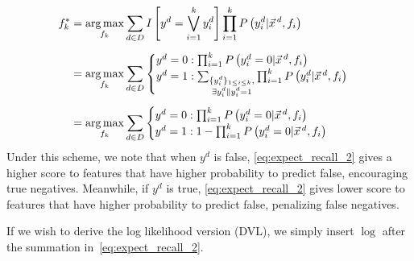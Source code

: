\begin{align}
f_k^*&=\argmax_{f_k}\sum_{d\in D}I\left[y^d=\bigvee_{i=1}^k y^d_i\right]\prod_{i=1}^kP\left(y_i^d|\vec{x}^{\,d},f_i\right)\nonumber\\[0.5em]
&=\argmax_{f_k}\sum_{d\in D}
\begin{cases}
	y^d=0: \prod_{i=1}^kP\left(y_i^d=0|\vec{x}^{\,d},f_i\right)\\
	y^d=1: \sum_{\substack{\{y_i^d\}_{1\leq i\leq k},\\ \exists{y_i^d\|y_i^d=1}}}\prod_{i=1}^kP\left(y_i^d|\vec{x}^{\,d},f_i\right)
\end{cases}\nonumber\\[0.5em]
&=\argmax_{f_k}\sum_{d\in D}
\begin{cases}
	y^d=0: \prod_{i=1}^kP\left(y_i^d=0|\vec{x}^{\,d},f_i\right)\\
	y^d=1: 1-\prod_{i=1}^kP\left(y_i^d=0|\vec{x}^{\,d},f_i\right)
\end{cases}\label{eq:expect_recall_2}%
\end{align}
Under this scheme, we note that when $y^d$ is false,
\eqref{eq:expect_recall_2} gives a higher score to features that have
higher probability to predict false, encouraging true negatives.
Meanwhile, if $y^d$ is true, \eqref{eq:expect_recall_2} gives lower
score to features that have higher probability to predict false,
penalizing false negatives.

If we wish to derive the log likelihood version (DVL), we simply insert
$\log$ after the summation in~\eqref{eq:expect_recall_2}.
